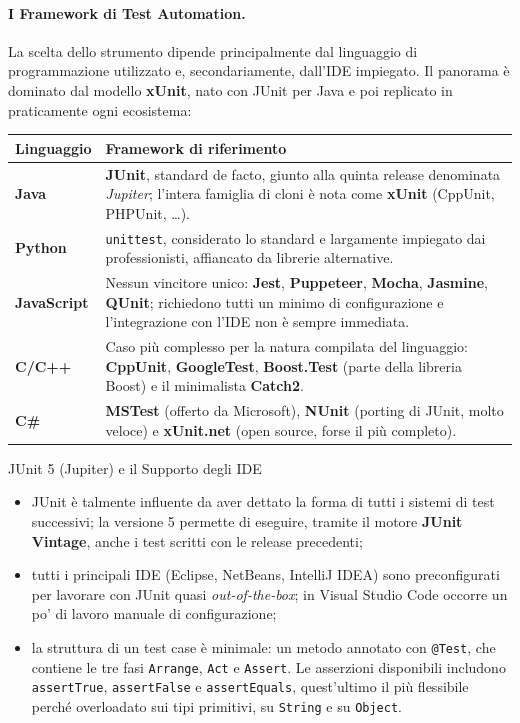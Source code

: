 \documentclass[12pt]{extarticle}
\begin{document}
\paragraph{I Framework di Test Automation.}
La scelta dello strumento dipende principalmente dal linguaggio di programmazione utilizzato e, secondariamente, dall'IDE impiegato. Il panorama è dominato dal modello \textbf{xUnit}, nato con JUnit per Java e poi replicato in praticamente ogni ecosistema:
\begin{center}
\small
\begin{tabular}{p{3.4cm}p{11.2cm}}
    \toprule
    \textbf{Linguaggio} & \textbf{Framework di riferimento} \\
    \midrule
    \textbf{Java} & \textbf{JUnit}, standard de facto, giunto alla quinta release denominata \textit{Jupiter}; l'intera famiglia di cloni è nota come \textbf{xUnit} (CppUnit, PHPUnit, \dots). \\
    \addlinespace
    \textbf{Python} & \texttt{unittest}, considerato lo standard e largamente impiegato dai professionisti, affiancato da librerie alternative. \\
    \addlinespace
    \textbf{JavaScript} & Nessun vincitore unico: \textbf{Jest}, \textbf{Puppeteer}, \textbf{Mocha}, \textbf{Jasmine}, \textbf{QUnit}; richiedono tutti un minimo di configurazione e l'integrazione con l'IDE non è sempre immediata. \\
    \addlinespace
    \textbf{C/C++} & Caso più complesso per la natura compilata del linguaggio: \textbf{CppUnit}, \textbf{GoogleTest}, \textbf{Boost.Test} (parte della libreria Boost) e il minimalista \textbf{Catch2}. \\
    \addlinespace
    \textbf{C\#} & \textbf{MSTest} (offerto da Microsoft), \textbf{NUnit} (porting di JUnit, molto veloce) e \textbf{xUnit.net} (open source, forse il più completo). \\
    \bottomrule
\end{tabular}
\end{center}

\begin{cbox}{JUnit 5 (Jupiter) e il Supporto degli IDE}
\begin{itemize}
    \item JUnit è talmente influente da aver dettato la forma di tutti i sistemi di test successivi; la versione 5 permette di eseguire, tramite il motore \textbf{JUnit Vintage}, anche i test scritti con le release precedenti;
    \item tutti i principali IDE (Eclipse, NetBeans, IntelliJ IDEA) sono preconfigurati per lavorare con JUnit quasi \textit{out-of-the-box}; in Visual Studio Code occorre un po' di lavoro manuale di configurazione;
    \item la struttura di un test case è minimale: un metodo annotato con \texttt{@Test}, che contiene le tre fasi \texttt{Arrange}, \texttt{Act} e \texttt{Assert}. Le asserzioni disponibili includono \texttt{assertTrue}, \texttt{assertFalse} e \texttt{assertEquals}, quest'ultimo il più flessibile perché overloadato sui tipi primitivi, su \texttt{String} e su \texttt{Object}.
\end{itemize}
\end{cbox}
\end{document}
